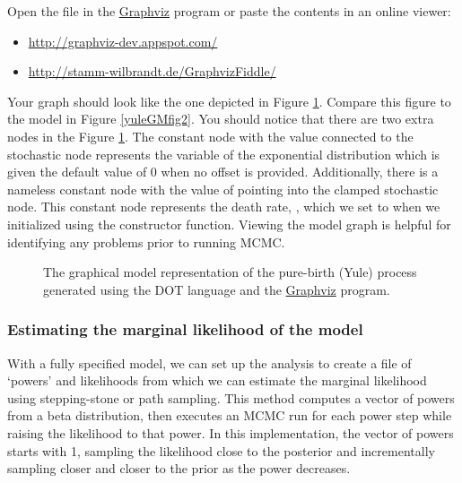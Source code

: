 Open the  file in the \href{http://www.graphviz.org/}{Graphviz} program or paste the contents in an online viewer:
\begin{itemize}[noitemsep,nolistsep]
  \item \href{http://graphviz-dev.appspot.com/}{http://graphviz-dev.appspot.com/}
  \item \href{http://stamm-wilbrandt.de/GraphvizFiddle/}{http://stamm-wilbrandt.de/GraphvizFiddle/}
\end{itemize}

Your graph should look like the one depicted in Figure \ref{yuleGMGVfig}.
Compare this figure to the model in Figure \ref{yuleGMfig2}.
You should notice that there are two extra nodes in the Figure \ref{yuleGMGVfig}. 
The constant node with the value  connected to the  stochastic node represents the  variable of the exponential distribution which is given the default value of 0 when no offset is provided. 
Additionally, there is a nameless constant node with the value of  pointing into the clamped  stochastic node. 
This constant node represents the death rate, , which we set to  when we initialized  using the  constructor function.
Viewing the model graph is helpful for identifying any problems prior to running MCMC. 
\begin{figure}[h!]
\centering
{}
\caption{\small The graphical model representation of the pure-birth (Yule) process generated using the DOT language and the \href{http://www.graphviz.org/}{Graphviz} program.}
\label{yuleGMGVfig}
\end{figure}


\subsubsection{Estimating the marginal likelihood of the model}

With a fully specified model, we can set up the  analysis to create a file of `powers' and likelihoods from which we can estimate the marginal likelihood using stepping-stone or path sampling. 
This method computes a vector of powers from a beta distribution, then executes an MCMC run for each power step while raising the likelihood to that power. In this implementation, the vector of powers starts with 1, sampling the likelihood close to the posterior and incrementally sampling closer and closer to the prior as the power decreases. 

